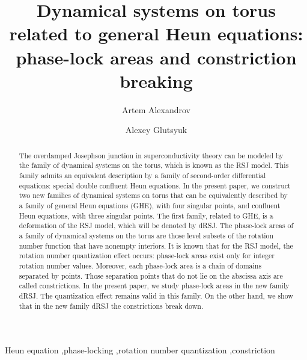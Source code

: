 \documentclass[preprint,12pt]{elsarticle}
\theoremstyle{plain}
\numberwithin{equation}{section}
\numberwithin{equation}{section}
\begin{document}
\title{Dynamical systems on torus related to general Heun equations: phase-lock areas and constriction breaking}

\author[1,2,3]{\normalsize Artem Alexandrov}
\author[4,2,5]{\normalsize Alexey Glutsyuk}


\begin{keyword}
    Heun equation \sep phase-locking \sep rotation number quantization \sep constriction
\end{keyword}

\begin{abstract}
The overdamped Josephson junction in superconductivity theory can be modeled by the family of dynamical systems on the torus, which is known as the RSJ model. This family admits an equivalent description by a family of second-order differential equations: special double confluent Heun equations. In the present paper, we construct two new families of dynamical systems on torus that can be equivalently described by a family of general Heun equations (GHE), with four singular points, and confluent Heun equations, with three singular points. The first family, related to GHE, is a deformation of the RSJ model, which will be denoted by dRSJ. The phase-lock areas of a family of dynamical systems on the torus are those level subsets of the rotation number function that have nonempty interiors. It is known that for the RSJ model, the rotation number quantization effect occurs: phase-lock areas exist only for integer rotation number values. Moreover, each phase-lock area is a chain of domains separated by points. Those separation points that do not lie on the abscissa axis are called constrictions. In the present paper, we study phase-lock areas in the new family dRSJ. The quantization effect remains valid in this family. On the other hand, we show that in the new family dRSJ the constrictions break down. 
\end{abstract}
\end{document}
